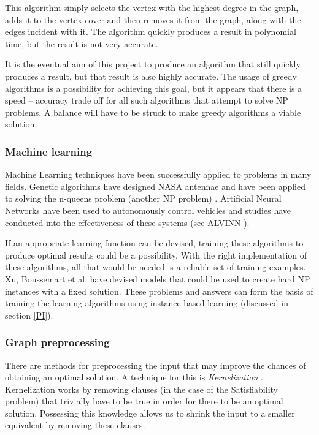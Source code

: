 \documentclass[11pt]{article}
\theoremstyle{definition}
\begin{document}
        This algorithm simply selects the vertex with the highest degree in the graph, adds it to the vertex cover
        and then removes it from the graph, along with the edges incident with it. The algorithm  quickly produces
        a result in polynomial time, but the result is not very accurate.
        
        It is the eventual aim of this project to produce an algorithm that still quickly produces a result,
        but that result is also highly accurate. The usage of greedy algorithms is a possibility for achieving this goal,
        but it appears that there is a speed -- accuracy trade off for all such algorithms that attempt to
        solve NP problems. A balance will have to be struck to make greedy algorithms a viable solution. 

      \subsubsection{Machine learning} \label{sec:machine}
        Machine Learning techniques have been successfully applied to problems in many fields. Genetic algorithms have
        designed NASA antennae \cite{citeulike:NASA} and have been applied to solving the n-queens problem (another
        NP problem) \cite{queens}. Artificial Neural Networks have been used to autonomously control vehicles
        and studies have conducted into the effectiveness of these systems (see ALVINN \cite{BAL97a}).
  
        If an appropriate learning function can be devised, training these algorithms to produce
        optimal results could be a possibility. With the right implementation of these algorithms, all that
        would be needed is a reliable set of training examples. Xu, Boussemart et al. \cite{citeulike:XuSimple} have devised
        models that could be used to create hard NP instances with a fixed solution. These problems and answers
        can form the basis of training the learning algorithms using instance based learning (discussed in section \ref{PI}). 
      
      \subsubsection{Graph preprocessing} \label{sec:prePro}
        There are methods for preprocessing the input that may improve the chances of obtaining an optimal solution.
        A technique for this is \emph{Kernelization} \cite{paper:KernelIntro}. Kernelization works by removing clauses
        (in the case of the Satisfiability problem) that trivially have to be true in order for there to be an
        optimal solution.
        Possessing this knowledge allows us to shrink the input to a smaller equivalent by removing these clauses.
 
\end{document}
